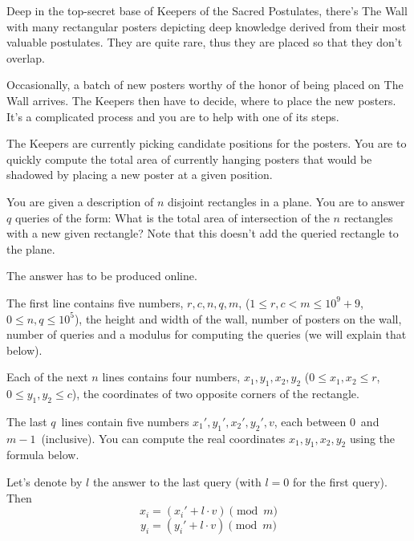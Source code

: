 





Deep in the top-secret base of Keepers of the Sacred Postulates, there's The
Wall with many rectangular posters depicting deep knowledge derived from their
most valuable postulates. They are quite rare, thus they are placed so that they don't overlap.

Occasionally, a batch of new posters worthy of the honor of
being placed on The Wall arrives. The Keepers then have to decide, where to place
the new posters. It's a complicated process and you are to help with one of its steps.

The Keepers are currently picking candidate positions for the posters. You are
to quickly compute the total area of currently hanging posters that would
be shadowed by placing a new poster at a given position.


You are given a description of $n$ disjoint rectangles in a plane. You are to answer
$q$ queries of the form: What is the total area of intersection of the $n$ rectangles
with a new given rectangle? Note that this doesn't add the queried rectangle to the plane.

The answer has to be produced online.


The first line contains five numbers, $r, c, n, q, m$, ($1 \leq r, c < m \leq 10^9 + 9$, $0 \leq n,q \leq 10^5$),
the height and width of the wall, number of posters on the wall, number of
queries and a modulus for computing the queries (we will explain that below).

Each of the next $n$ lines contains four numbers, $x_1, y_1, x_2, y_2$ ($0 \leq x_1, x_2 \leq r$,
$0 \leq y_1, y_2 \leq c$), the coordinates of two opposite corners of the rectangle.

The last $q$ lines contain five numbers $x_1', y_1', x_2', y_2', v$, each between
$0$ and $m - 1$ (inclusive). You can compute the real coordinates $x_1, y_1, x_2, y_2$
using the formula below.

Let's denote by $l$ the answer to the last query (with $l=0$ for the first query). Then 
$$x_i = (x_i' + l \cdot v) \pmod m$$
$$y_i = (y_i' + l \cdot v) \pmod m$$

